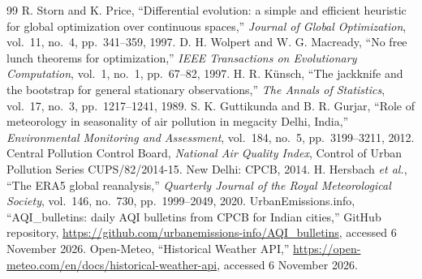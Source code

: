 \begin{thebibliography}{99}
 R. Storn and K. Price, ``Differential evolution: a simple and efficient heuristic for global optimization over continuous spaces,'' \emph{Journal of Global Optimization}, vol.~11, no.~4, pp.~341--359, 1997.
 D. H. Wolpert and W. G. Macready, ``No free lunch theorems for optimization,'' \emph{IEEE Transactions on Evolutionary Computation}, vol.~1, no.~1, pp.~67--82, 1997.
 H. R. K\"unsch, ``The jackknife and the bootstrap for general stationary observations,'' \emph{The Annals of Statistics}, vol.~17, no.~3, pp.~1217--1241, 1989.
 S. K. Guttikunda and B. R. Gurjar, ``Role of meteorology in seasonality of air pollution in megacity Delhi, India,'' \emph{Environmental Monitoring and Assessment}, vol.~184, no.~5, pp.~3199--3211, 2012.
 Central Pollution Control Board, \emph{National Air Quality Index}, Control of Urban Pollution Series CUPS/82/2014-15. New Delhi: CPCB, 2014.
 H. Hersbach \emph{et al.}, ``The ERA5 global reanalysis,'' \emph{Quarterly Journal of the Royal Meteorological Society}, vol.~146, no.~730, pp.~1999--2049, 2020.
 UrbanEmissions.info, ``AQI\_bulletins: daily AQI bulletins from CPCB for Indian cities,'' GitHub repository, \url{https://github.com/urbanemissions-info/AQI_bulletins}, accessed 6 November 2026.
 Open-Meteo, ``Historical Weather API,'' \url{https://open-meteo.com/en/docs/historical-weather-api}, accessed 6 November 2026.
\end{thebibliography}
\endgroup
